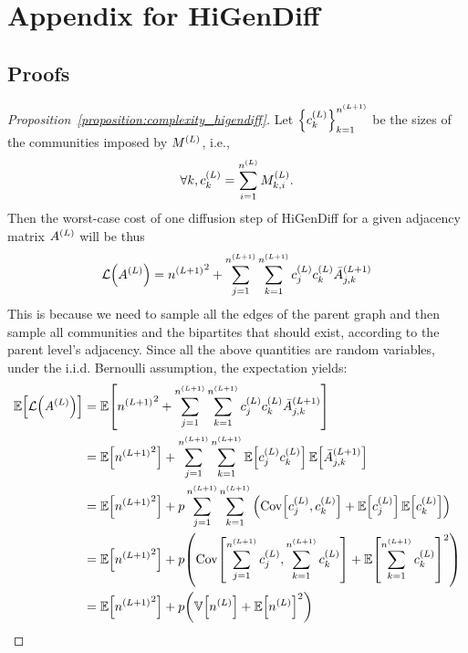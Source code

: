\chapter{Appendix for HiGenDiff}

\section{Proofs}
\label{sec:appendix_higendiff_theory}
\begin{proof}[Proposition~\ref{proposition:complexity_higendiff}]
Let $\mathopen{}\left\{c^{\mathopen{}\left(L\right)}_k\right\}_{k=1}^{n^{\mathopen{}\left(L+1\right)}}$ be the sizes of the communities imposed by $M^{\mathopen{}\left(L\right)}$, i.e., 
\begin{equation}
    \forall k, c^{\mathopen{}\left(L\right)}_k=\sum_{i=1}^{n^{\mathopen{}\left(L\right)}}{M^{\mathopen{}\left(L\right)}_{k,i}}.
\end{equation}
Then the worst-case cost of one diffusion step of HiGenDiff for a given adjacency matrix $A^{\mathopen{}\left(L\right)}$ will be thus
\begin{equation}
    \mathcal{L}\mathopen{}\left(A^{\mathopen{}\left(L\right)}\right)={n^{\mathopen{}\left(L+1\right)}}^2 + \sum_{j=1}^{n^{\mathopen{}\left(L+1\right)}}\sum_{k=1}^{n^{\mathopen{}\left(L+1\right)}}{c^{\mathopen{}\left(L\right)}_j c^{\mathopen{}\left(L\right)}_k \bar{A}_{j,k}^{\mathopen{}\left(L+1\right)}}
\end{equation}
This is because we need to sample all the edges of the parent graph and then sample all communities and the bipartites that should exist, according to the parent level's adjacency. Since all the above quantities are random variables, under the i.i.d. Bernoulli assumption, the expectation yields:
\begin{align}
    \begin{split}
        \mathbb{E}\off{\mathcal{L}\of{A^{\of{L}}}}&=\mathbb{E}\off{{n^{\of{L+1}}}^2 + \sum_{j=1}^{n^{\of{L+1}}}\sum_{k=1}^{n^{\of{L+1}}}{c^{\of{L}}_j c^{\of{L}}_k \bar{A}_{j,k}^{\of{L+1}}}} \\
        &= \mathbb{E}\off{{n^{\of{L+1}}}^2}+\sum_{j=1}^{n^{\of{L+1}}}\sum_{k=1}^{n^{\of{L+1}}}{\mathbb{E}\off{c^{\of{L}}_j c^{\of{L}}_k} \mathbb{E}\off{\bar{A}_{j,k}^{\of{L+1}}}} \\
        &= \mathbb{E}\off{{n^{\of{L+1}}}^2}+p\sum_{j=1}^{n^{\of{L+1}}}\sum_{k=1}^{n^{\of{L+1}}}{\of{\mathrm{Cov}\off{c^{\of{L}}_j,c^{\of{L}}_k}+\mathbb{E}\off{c^{\of{L}}_j}\mathbb{E}\off{c^{\of{L}}_k}}} \\
        &= \mathbb{E}\off{{n^{\of{L+1}}}^2}+p\of{\mathrm{Cov}\off{\sum_{j=1}^{n^{\of{L+1}}}{c^{\of{L}}_j},\sum_{k=1}^{n^{\of{L+1}}}{c^{\of{L}}_k}}+\mathbb{E}\off{\sum_{k=1}^{n^{\of{L+1}}}{c^{\of{L}}_k}}^2}\\
         &= \mathbb{E}\off{{n^{\of{L+1}}}^2} +p \of{\mathbb{V}\off{n^{\of{L}}}+\mathbb{E}\off{n^{\of{L}}}^2} \\

\end{split}
\end{align}
\end{proof}
